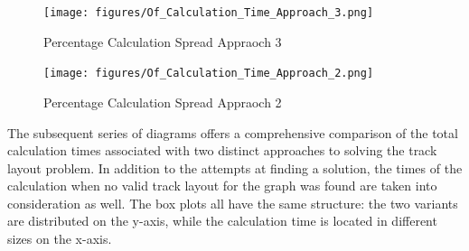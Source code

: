 \documentclass[bachelor, english]{algothesis}
\begin{document}
\begin{figure}[ht]
    \hspace{-0.9cm}
    \texttt{[image: figures/Of\_Calculation\_Time\_Approach\_3.png]}
    \caption{Percentage Calculation Spread Appraoch 3}
    \label{fig:Percentage_3}
\end{figure}

\begin{figure}[ht]
    \hspace{-0.9cm}
    \texttt{[image: figures/Of\_Calculation\_Time\_Approach\_2.png]}
    \caption{Percentage Calculation Spread Appraoch 2}
    \label{fig:Percentage_2}
\end{figure}

\noindent
The subsequent series of diagrams offers a comprehensive comparison of the total calculation times associated with two distinct approaches to solving the track layout problem. In addition to the attempts at finding a solution, the times of the calculation when no valid track layout for the graph was found are taken into consideration as well. The box plots all have the same structure: the two variants are distributed on the y-axis, while the calculation time is located in different sizes on the x-axis.
\end{document}

